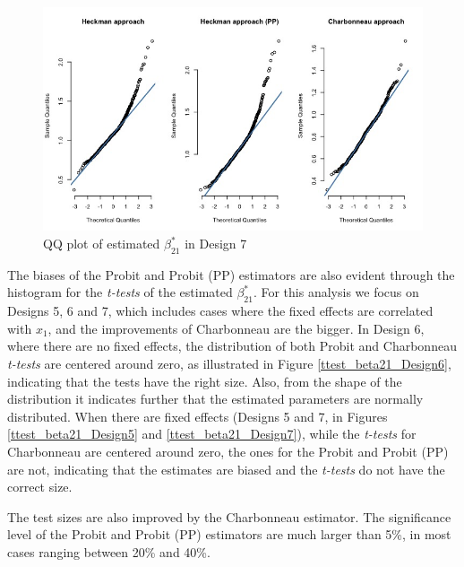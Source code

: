 \begin{figure}
  \vspace{-2.5em}%
  \centerline{\includegraphics[scale=.4]{content/Figures/QQ_beta_21_Design7.png}}
  \caption{\footnotesize{QQ plot of estimated $\beta_{21}^*$ in Design 7}}
  \label{QQ_beta_21_Design7}
\end{figure}

The biases of the Probit and Probit (PP) estimators are also evident through the histogram for the \textit{t-tests} of the estimated $\beta_{21}^*$. For this analysis we focus on Designs 5, 6 and 7, which includes cases where the fixed effects are correlated with $x_1$, and the improvements of Charbonneau are the bigger. In Design 6, where there are no fixed effects, the distribution of both Probit and Charbonneau \textit{t-tests} are centered around zero, as illustrated in Figure \ref{ttest_beta21_Design6}, indicating that the tests have the right size. Also, from the shape of the distribution it indicates further that the estimated parameters are normally distributed. When there are fixed effects (Designs 5 and 7, in Figures \ref{ttest_beta21_Design5} and \ref{ttest_beta21_Design7}), while the \textit{t-tests} for Charbonneau are centered around zero, the ones for the Probit and Probit (PP) are not, indicating that the estimates are biased and the \textit{t-tests} do not have the correct size. 

The test sizes are also improved by the Charbonneau estimator. The significance level of the Probit and Probit (PP) estimators are much larger than 5\%, in most cases ranging between 20\% and 40\%. 

